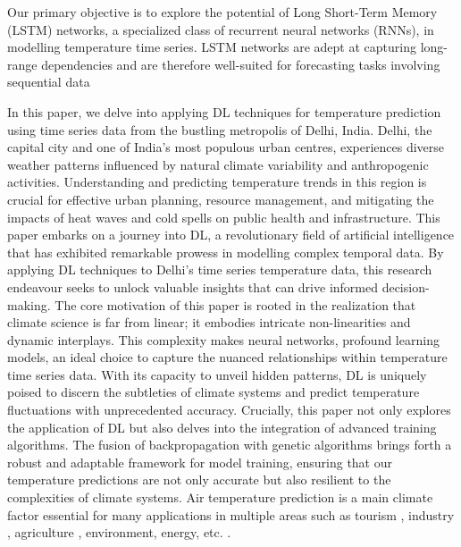 Our primary objective is to explore the potential of Long Short-Term Memory (LSTM) networks, a specialized class of recurrent neural networks (RNNs), in modelling temperature time series. LSTM networks are adept at capturing long-range dependencies and are therefore well-suited for forecasting tasks involving sequential data

In this paper, we delve into applying DL techniques for temperature prediction using time series data from the bustling metropolis of Delhi, India. Delhi, the capital city and one of India's most populous urban centres, experiences diverse weather patterns influenced by natural climate variability and anthropogenic activities. Understanding and predicting temperature trends in this region is crucial for effective urban planning, resource management, and mitigating the impacts of heat waves and cold spells on public health and infrastructure. This paper embarks on a journey into DL, a revolutionary field of artificial intelligence that has exhibited remarkable prowess in modelling complex temporal data. By applying DL techniques to Delhi's time series temperature data, this research endeavour seeks to unlock valuable insights that can drive informed decision-making. The core motivation of this paper is rooted in the realization that climate science is far from linear; it embodies intricate non-linearities and dynamic interplays. This complexity makes neural networks, profound learning models, an ideal choice to capture the nuanced relationships within temperature time series data. With its capacity to unveil hidden patterns, DL is uniquely poised to discern the subtleties of climate systems and predict temperature fluctuations with unprecedented accuracy. Crucially, this paper not only explores the application of DL but also delves into the integration of advanced training algorithms. The fusion of backpropagation with genetic algorithms brings forth a robust and adaptable framework for model training, ensuring that our temperature predictions are not only accurate but also resilient to the complexities of climate systems. Air temperature prediction is a main climate factor essential for many applications in multiple areas such as tourism \cite{salman2015weather}, industry \cite{kumar2021opportunities}, agriculture \cite{mohan2018deep}, environment, energy, etc. \cite{abdel2004hourly}.

